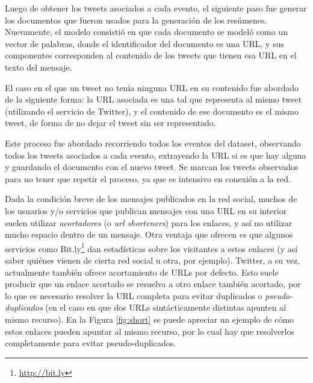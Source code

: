 \documentclass[upright, contnum]{umemoria}
\begin{document}
    Luego de obtener los tweets asociados a cada evento, el siguiente
    paso fue generar los documentos que fueron usados para la
    generación de los resúmenes. Nuevamente, el modelo consistió en que cada
    documento se modeló como un vector de palabras, donde el
    identificador del documento es una URL, y sus componentes
    corresponden al contenido de los tweets que tienen esa URL en el
    texto del mensaje.

    El caso en el que un tweet no tenía ninguna URL en su contenido
    fue abordado de la siguiente forma: la URL asociada es una tal que
    representa al mismo tweet (utilizando el servicio de Twitter), y
    el contenido de ese documento es el mismo tweet, de forma de no
    dejar el tweet sin ser representado.

    Este proceso fue abordado recorriendo todos los eventos del
    dataset, observando todos los tweets asociados a cada evento,
    extrayendo la URL si es que hay alguna y guardando el documento
    con el nuevo tweet. Se marcan los tweets observados para no tener
    que repetir el proceso, ya que es intensivo en conexión a la red.

    Dada la condición breve de los mensajes publicados en la red
    social, muchos de los usuarios y/o servicios que publican mensajes
    con una URL en su interior suelen utilizar \emph{acortadores} 
    (o \emph{url shorteners}) para los enlaces, y así no utilizar mucho
    espacio dentro de un
    mensaje. Otra ventaja que ofrecen es que algunos servicios como
    Bit.ly\footnote{\href{http://bit.ly}{http://bit.ly} } dan estadísticas sobre los visitantes a
    estos enlaces (y así saber quiénes vienen de cierta red social u
    otra, por ejemplo). Twitter, a su vez, actualmente también ofrece
    acortamiento de URLs por defecto. Esto suele producir que un enlace
    acortado se resuelva a otro enlace también acortado, por lo que es
    necesario resolver la URL completa para evitar duplicados o
    \emph{pseudo-duplicados} (en el caso en que dos URLs sintácticamente
    distintas apunten al mismo recurso). En la Figura \ref{fig:short}
    se puede apreciar un ejemplo de cómo estos enlaces pueden apuntar
    al mismo recurso, por lo cual hay que resolverlos completamente
    para evitar pseudo-duplicados.
\end{document}
